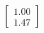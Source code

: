 \documentclass[preview]{standalone}
\begin{document}
\begin{align*}
\begin{bmatrix} 1.00 \\ 1.47 \end{bmatrix}
\end{align*}
\end{document}
